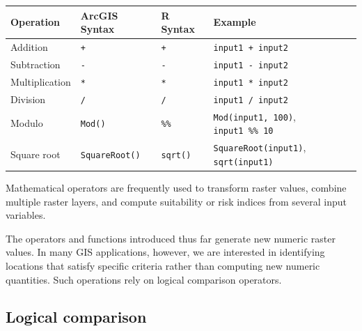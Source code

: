 \documentclass[
  letterpaper,
]{book}
\newcounter{none} %
\begin{document}
{\def\LTcaptype{none} %
\begin{longtable}[]{@{}
  >{\raggedright\arraybackslash}p{}
  >{\raggedright\arraybackslash}p{}
  >{\raggedright\arraybackslash}p{}
  >{\raggedright\arraybackslash}p{}@{}}
\toprule\noalign{}
\begin{minipage}[b]{\linewidth}\raggedright
Operation
\end{minipage} & \begin{minipage}[b]{\linewidth}\raggedright
ArcGIS Syntax
\end{minipage} & \begin{minipage}[b]{\linewidth}\raggedright
R Syntax
\end{minipage} & \begin{minipage}[b]{\linewidth}\raggedright
Example
\end{minipage} \\
\midrule\noalign{}
\endhead
\bottomrule\noalign{}
\endlastfoot
Addition & \texttt{+} & \texttt{+} & \texttt{input1\ +\ input2} \\
Subtraction & \texttt{-} & \texttt{-} & \texttt{input1\ -\ input2} \\
Multiplication & \texttt{*} & \texttt{*} & \texttt{input1\ *\ input2} \\
Division & \texttt{/} & \texttt{/} & \texttt{input1\ /\ input2} \\
Modulo & \texttt{Mod()} & \texttt{\%\%} & \texttt{Mod(input1,\ 100)},
\texttt{input1\ \%\%\ 10} \\
Square root & \texttt{SquareRoot()} & \texttt{sqrt()} &
\texttt{SquareRoot(input1)}, \texttt{sqrt(input1)} \\
\end{longtable}
}

Mathematical operators are frequently used to transform raster values,
combine multiple raster layers, and compute suitability or risk indices
from several input variables.

The operators and functions introduced thus far generate new numeric
raster values. In many GIS applications, however, we are interested in
identifying locations that satisfy specific criteria rather than
computing new numeric quantities. Such operations rely on logical
comparison operators.

\subsection{Logical comparison}\label{logical-comparison}
\end{document}
